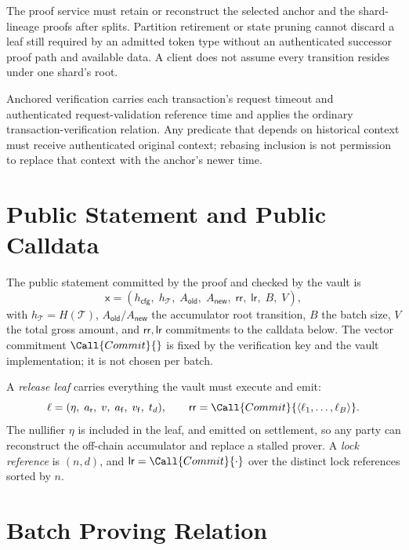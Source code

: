 The proof service must retain or reconstruct the selected anchor and the shard-lineage proofs after splits. Partition retirement or state pruning cannot discard a leaf still required by an admitted token type without an authenticated successor proof path and available data. A client does not assume every transition resides under one shard's root.

Anchored verification carries each transaction's request timeout and authenticated request-validation reference time and applies the ordinary transaction-verification relation. Any predicate that depends on historical context must receive authenticated original context; rebasing inclusion is not permission to replace that context with the anchor's newer time.

\section{Public Statement and Public Calldata}\label{app:bridging-public}

The public statement committed by the proof and checked by the vault is
\[
\mathsf{x} = (h_\mathsf{cfg},\; h_\mathcal{T},\; A_\mathsf{old},\; A_\mathsf{new},\; \mathsf{rr},\; \mathsf{lr},\; B,\; V),
\]
with $h_\mathcal{T} = H(\mathcal{T})$, $A_\mathsf{old}/A_\mathsf{new}$ the accumulator root transition, $B$ the batch size, $V$ the total gross amount, and $\mathsf{rr}, \mathsf{lr}$ commitments to the calldata below. The vector commitment $\Call{Commit}{}$ is fixed by the verification key and the vault implementation; it is not chosen per batch.

A \emph{release leaf} carries everything the vault must execute and emit:
\[
\ell = (\eta,\; a_\mathsf{r},\; v,\; a_\mathsf{f},\; v_\mathsf{f},\; t_d),
\qquad \mathsf{rr} = \Call{Commit}{\langle \ell_1,\ldots,\ell_B \rangle}.
\]
The nullifier $\eta$ is included in the leaf, and emitted on settlement, so any party can reconstruct the off-chain accumulator and replace a stalled prover. A \emph{lock reference} is $(n,d)$, and $\mathsf{lr} = \Call{Commit}{\cdot}$ over the distinct lock references sorted by $n$.

\section{Batch Proving Relation}\label{app:bridging-relation}

